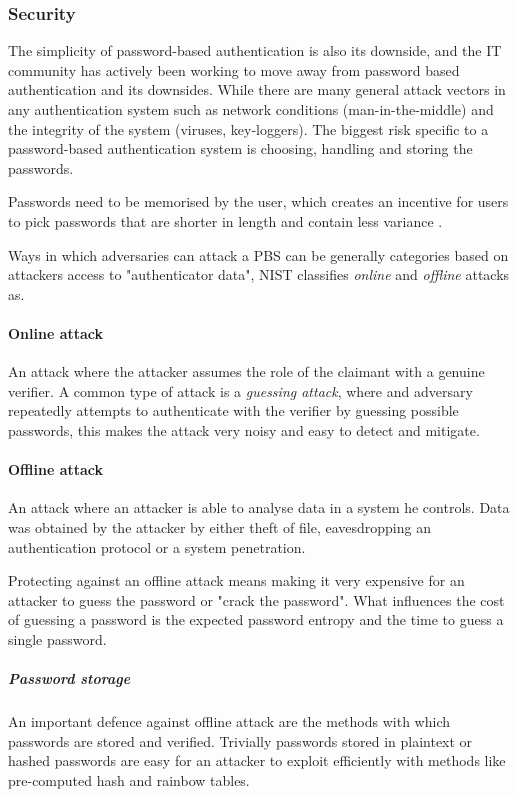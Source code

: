 \subsubsection{Security}

The simplicity of password-based authentication is also its downside, and the IT community has actively been working to move away from password based authentication and its downsides.
While there are many general attack vectors in any authentication system such as network conditions (man-in-the-middle) and the integrity of the system (viruses, key-loggers). The biggest risk specific to a password-based authentication system is choosing, handling and storing the passwords. %

Passwords need to be memorised by the user, which creates an incentive for users to pick passwords that are shorter in length and contain less variance \cite{conklin2004password}. %

Ways in which adversaries can attack a PBS can be generally categories based on attackers access to "authenticator data", NIST \cite{grassi2017} classifies \textit{online} and \textit{offline} attacks as.

\paragraph{Online attack} An attack where the attacker assumes the role of the claimant with a genuine verifier.
A common type of attack is a \textit{guessing attack}, where and adversary repeatedly attempts to authenticate with the verifier by guessing possible passwords, this makes the attack very noisy and easy to detect and mitigate.


\paragraph{Offline attack} An attack where an attacker is able to analyse data in a system he controls. Data was obtained by the attacker by either theft of file, eavesdropping an authentication protocol or a system penetration.

Protecting against an offline attack means making it very expensive for an attacker to guess the password or "crack the password".
What influences the cost of guessing a password is the expected password entropy and the time to guess a single password.

\subparagraph{Password storage}
An important defence against offline attack are the methods with which passwords are stored and verified.
Trivially passwords stored in plaintext or hashed passwords are easy for an attacker to exploit efficiently with methods like pre-computed hash and rainbow tables. 

